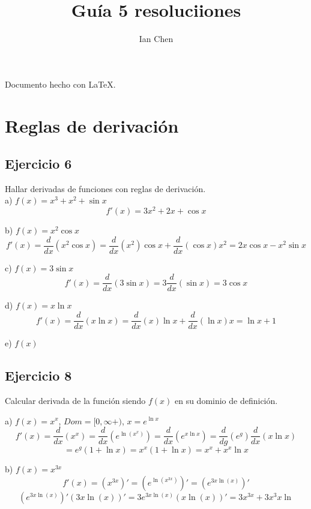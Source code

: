 \documentclass[]{article}
\title{Guía 5 resoluciiones}
\author{Ian Chen}
\begin{document}
\maketitle
Documento hecho con \LaTeX.

\section{Reglas de derivación}
\subsection{Ejercicio 6}
Hallar derivadas de funciones con reglas de derivación.\\[6pt]

a) $f(x)=x^3+x^2+\sin x$
$$f'(x)=3x^2+2x+\cos x$$

b) $f(x)=x^2 \cos x$
$$f'(x)=\frac{d}{dx}\left(x^2 \cos x \right)=\frac{d}{dx}\left(x^2 \right)\cos x + \frac{d}{dx}\left(\cos x\right)x^2=2x \cos x - x^2 \sin x$$

c) $f(x)=3\sin x$
$$f'(x)=\frac{d}{dx}\left(3\sin x\right)=3\frac{d}{dx}\left(\sin x\right)= 3\cos x$$

d) $f(x)=x \ln x$
$$f'(x)= \frac{d}{dx}\left(x \ln x\right) = \frac{d}{dx}\left(x\right)\ln x + \frac{d}{dx}\left(\ln x\right)x= \ln x + 1$$

e) $f(x)$

\subsection{Ejercicio 8}
Calcular derivada de la función siendo $f(x)$ en su dominio de definición.

a) $f(x)=x^x$, $Dom=[0, \infty+)$, $x=e^{\ln x}$
$$f'(x)=\frac{d}{dx}\left(x^x\right) = \frac{d}{dx}\left(e^{\ln(x^x)}\right)=\frac{d}{dx}\left(e^{x\ln x}\right)=\frac{d}{dg}\left(e^{g}\right)\frac{d}{dx}\left(x\ln x\right)$$
$$= e^g ( 1 + \ln x) = x^x(1+\ln x) = x^x + x^x\ln x$$ 

b) $f(x)=x^{3x}$
$$f'(x)=(x^{3x})'=(e^{\ln(x^{3x})})'=(e^{3x\ln(x)})'$$
$$(e^{3x\ln(x)})'(3x\ln(x))'=3e^{3x\ln(x)}(x\ln(x))'=3x^{3x}+3x^3x\ln$$
\end{document}
